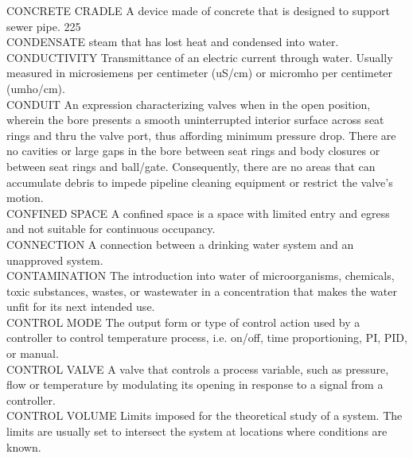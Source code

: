 \documentclass{article}
\begin{document}
CONCRETE CRADLE
A device made of concrete that is designed to support sewer pipe. 225 
\vspace{0.3cm}\\
CONDENSATE
steam that has lost heat and condensed into water.
\vspace{0.3cm}\\
CONDUCTIVITY
Transmittance of an electric current through water. Usually measured in microsiemens per centimeter (uS/cm) or micromho per centimeter (umho/cm).
\vspace{0.3cm}\\
CONDUIT
An expression characterizing valves when in the open position, wherein the bore presents a smooth uninterrupted interior surface across seat rings and thru the valve port, thus affording minimum pressure drop. There are no cavities or large gaps in the bore between seat rings and body closures or between seat rings and ball/gate. Consequently, there are no areas that can accumulate debris to impede pipeline cleaning equipment or restrict the valve's motion.
\vspace{0.3cm}\\


CONFINED SPACE
A confined space is a space with limited entry and egress and not suitable for continuous occupancy.
\vspace{0.3cm}\\
CONNECTION
A connection between a drinking water system and an unapproved system.
\vspace{0.3cm}\\
CONTAMINATION
The introduction into water of microorganisms, chemicals, toxic substances, wastes, or wastewater in a concentration that makes the water unfit for its next intended use.
\vspace{0.3cm}\\

CONTROL MODE
The output form or type of control action used by a controller to control temperature process, i.e. on/off, time proportioning, PI, PID, or manual.
\vspace{0.3cm}\\

CONTROL VALVE
A valve that controls a process variable, such as pressure, flow or temperature by modulating its opening in response to a signal from a controller.
\vspace{0.3cm}\\
CONTROL VOLUME
Limits imposed for the theoretical study of a system. The limits are usually set to intersect the system at locations where conditions are known.
\vspace{0.3cm}\\
\end{document}
